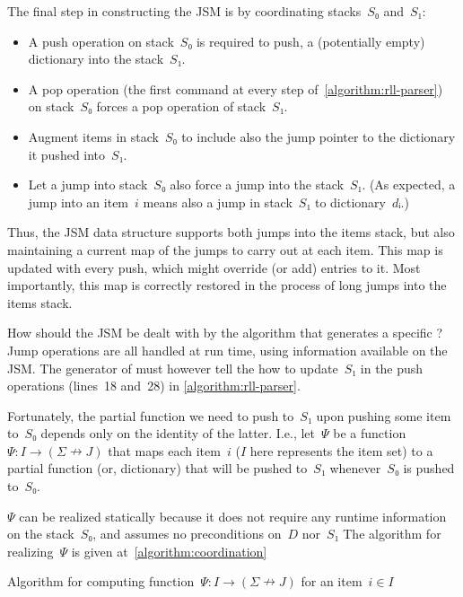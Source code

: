 The final step in constructing the JSM is by coordinating
  stacks~$S₀$ and~$S₁$:
  \begin{itemize}
      \item A push operation on stack~$S₀$ is required to push, a (potentially
        empty) dictionary into the stack~$S₁$.
      \item A pop operation (the first command at every step of~\cref{algorithm:rll-parser})
        on stack~$S₀$ forces a pop operation of stack~$S₁$.
      \item Augment items in stack~$S₀$ to include also the jump pointer to
        the dictionary it pushed into~$S₁$.
      \item Let a jump into stack~$S₀$ also
          force a jump into the stack~$S₁$.
          (As expected, a jump into an item~$i$ means also a jump
            in stack~$S₁$ to dictionary~$dᵢ$.)
  \end{itemize}
Thus, the JSM data structure supports both
  jumps into the items stack, but also maintaining
  a current map of the jumps to carry out at each item.
This map is updated with every push, which might
  override (or add) entries to it.
Most importantly, this map is correctly restored
  in the process of long jumps into the items stack.

How should the JSM be dealt with by the algorithm that generates
  a specific \RLLp?
Jump operations are all handled at run time,
  using information available on the JSM.
The generator of \RLLp must however tell the \RLLp how to
  update~$S₁$ in the push operations (lines~18 and~28) in
  \cref{algorithm:rll-parser}.

Fortunately, the partial function we need to push to~$S₁$ upon
  pushing some item to~$S₀$ depends only on the identity of the latter.
  I.e., let~$Ψ$ be a function~$Ψ: I→(Σ↛J)$ that maps each item~$i$ ($I$ here represents
  the item set) to a partial function (or, dictionary) that will be pushed to~$S₁$
  whenever~$S₀$ is pushed to~$S₀$.

$Ψ$ can be realized statically because it does not require any runtime
  information on the stack~$S₀$, and assumes no preconditions on~$D$ nor~$S₁$
  The algorithm for realizing~$Ψ$ is given at~\cref{algorithm:coordination}

\begin{algorithm}
  \begin{algorithmic}
  \caption{\label{algorithm:coordination}
  Algorithm for computing function~$Ψ: I→(Σ↛J)$ for
  an item~$i∈I$}
   
   
      \BREAK
    \FI
       
      \FI
    \ENDFOR
  \ENDFOR
  \end{algorithmic}
\end{algorithm}

